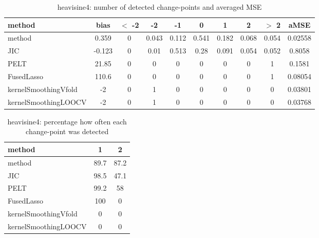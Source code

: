 \begin{table}[ht]
\centering
\begin{tabular}{l|c|ccccccc|c}
  \hline
method & bias & $<$ -2 & -2 & -1 & 0 & 1 & 2 & $>$ 2 & aMSE \\ 
  \hline
method & 0.359 &     0 & 0.043 & 0.112 & 0.541 & 0.182 & 0.068 & 0.054 & 0.02558 \\ 
  JIC & -0.123 &     0 &  0.01 & 0.513 &  0.28 & 0.091 & 0.054 & 0.052 & 0.8058 \\ 
  PELT & 21.85 &     0 &     0 &     0 &     0 &     0 &     0 &     1 & 0.1581 \\ 
  FusedLasso & 110.6 &     0 &     0 &     0 &     0 &     0 &     0 &     1 & 0.08054 \\ 
  kernelSmoothingVfold &    -2 &     0 &     1 &     0 &     0 &     0 &     0 &     0 & 0.03801 \\ 
  kernelSmoothingLOOCV &    -2 &     0 &     1 &     0 &     0 &     0 &     0 &     0 & 0.03768 \\ 
   \hline
\end{tabular}
\caption{heavisine4: number of detected change-points and averaged MSE} 
\label{tab:heavisine4Njumps}
\end{table}
\begin{table}[ht]
\centering
\begin{tabular}{l|cc}
  \hline
method & 1 & 2 \\ 
  \hline
method &   89.7 &   87.2 \\ 
  JIC &   98.5 &   47.1 \\ 
  PELT &   99.2 &     58 \\ 
  FusedLasso &    100 &      0 \\ 
  kernelSmoothingVfold &      0 &      0 \\ 
  kernelSmoothingLOOCV &      0 &      0 \\ 
   \hline
\end{tabular}
\caption{heavisine4: percentage how often each change-point was detected} 
\label{tab:heavisine4Detections}
\end{table}
